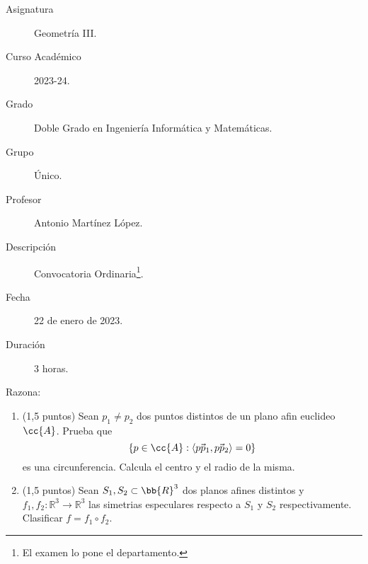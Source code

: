 \documentclass[12pt]{article}
\begin{document}

    
    

    \begin{description}
        \item[Asignatura] Geometría III.
        \item[Curso Académico] 2023-24.
        \item[Grado] Doble Grado en Ingeniería Informática y Matemáticas.
        \item[Grupo] Único.
        \item[Profesor] Antonio Martínez López.
        \item[Descripción] Convocatoria Ordinaria\footnote{El examen lo pone el departamento.}.
        \item[Fecha] 22 de enero de 2023.
        \item[Duración] 3 horas.
    
    \end{description}
    \newpage

    \begin{ejercicio}[3 puntos]
        Razona:
        
        \begin{enumerate}
        \item (1,5 puntos) Sean \( p_1\neq p_2 \) dos puntos distintos de un plano afin euclideo \( \cc{A} \).
        Prueba que 
        \[
        \{ p \in \cc{A} : \langle \vec{p p_1}, \vec{p p_2} \rangle = 0 \}
        \]
        es una circunferencia. Calcula el centro y el radio de la misma.
        
        \item (1,5 puntos) Sean \( S_1, S_2 \subset \bb{R}^3 \) dos planos afines distintos y \( f_1, f_2 : \mathbb{R}^3 \to \mathbb{R}^3 \) las simetrias especulares respecto a \( S_1 \) y \( S_2 \) respectivamente. Clasificar \( f = f_1 \circ f_2 \).
        \end{enumerate}
        \end{ejercicio}
        
\end{document}
